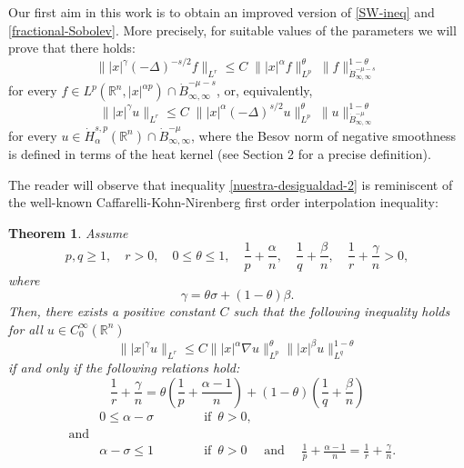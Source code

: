 \documentclass[12pt]{amsart}
\newcommand {\R}{\mathbb{R}}
\newcommand {\be}{\begin{equation}}
\newcommand {\ee}{\end{equation}}
\newtheorem{theorem}{Theorem}[section]
\begin{document}
Our first aim in this work is to obtain an improved version of \eqref{SW-ineq} and \eqref{fractional-Sobolev}. More precisely, for suitable values of the parameters we will prove that
there holds:
\be \| |x|^\gamma (-\Delta)^{-s/2} f  \|_{L^r} \leq 
C \; \| |x|^{\alpha} f  \|_{L^p}^\theta \;  \| f \|_{\dot{B}^{-\mu-s}_{\infty,\infty}}^{1-\theta}
\label{nuestra-desigualdad-1}
\ee
for every $f \in L^p(\R^n,|x|^{\alpha p})  \cap \dot{B}^{-\mu-s}_{\infty,\infty}$, or, equivalently, \be \| |x|^\gamma u \|_{L^r} \leq 
C \; \| |x|^{\alpha} (-\Delta)^{s/2} u  \|_{L^p}^\theta \;  \| u \|_{\dot{B}^{-\mu}_{\infty,\infty}}^{1-\theta}
\label{nuestra-desigualdad-2}
\ee
for every $u\in \dot{H}^{s,p}_\alpha(\R^n) \cap 
\dot{B}^{-\mu}_{\infty,\infty}$, where the Besov norm of negative smoothness is defined in terms of the heat kernel (see Section 2 for a precise definition).

The reader will observe that inequality \eqref{nuestra-desigualdad-2} is reminiscent of the well-known Caffarelli-Kohn-Nirenberg first order interpolation inequality:
\begin{theorem}\cite{CKN}
Assume 
\begin{equation*}
p, q \ge 1, \quad r>0, \quad 0\le \theta \le 1, \quad \frac{1}{p}+\frac{\alpha}{n}, \quad \frac{1}{q}+\frac{\beta}{n}, \quad \frac{1}{r}+\frac{\gamma}{n} >0,
\end{equation*}
where
\begin{equation*}
\label{sigma}
\gamma = \theta\sigma + (1-\theta)\beta.
\end{equation*}
Then, there exists a positive constant $C$ such that the following inequality holds for all $u\in C_0^\infty(\mathbb{R}^n)$
\begin{equation}
\label{ckn}
\| |x|^\gamma u\|_{L^r} \le C \| |x|^\alpha \nabla u \|_{L^p}^\theta \| |x|^\beta u\|_{L^q}^{1-\theta}
\end{equation}
if and only if the following relations hold:
\begin{equation*}
\label{reescale}
\frac{1}{r}+\frac{\gamma}{n} =  \theta \left( \frac{1}{p}+ \frac{\alpha-1}{n}\right) + (1-\theta)\left( \frac{1}{q}+ \frac{\beta}{n}\right)
\end{equation*}
\begin{align*}
&0 \le \alpha-\sigma& \qquad &\mbox{ if } \, \theta>0, &
\\ \nonumber \mbox{and} 
\\ &\alpha-\sigma \le 1&  \qquad &\mbox{ if } \, \theta>0 \quad \mbox{ and } \quad \frac{1}{p}+\frac{\alpha-1}{n}=\frac{1}{r}+\frac{\gamma}{n}.
\end{align*}
\end{theorem}
\end{document}
